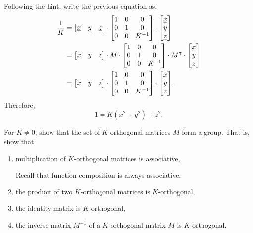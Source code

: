 \documentclass{ximera}
\begin{document}
\begin{problem}
\begin{freeResponse}
Following the hint, write the previous equation as,
\begin{align*}
\frac{1}{K} &=
\begin{bmatrix}
\underline{x} & \underline{y} & \underline{z}%
\end{bmatrix}  \cdot\begin{bmatrix}
1 & 0 & 0\\
0 & 1 & 0\\
0 & 0 & K^{-1}%
\end{bmatrix}  \cdot
\begin{bmatrix}
\underline{x}\\
\underline{y}\\
\underline{z}%
\end{bmatrix} \\
&= \begin{bmatrix}
    x & y & z
  \end{bmatrix} \cdot M \cdot
\begin{bmatrix}
1 & 0 & 0\\
0 & 1 & 0\\
0 & 0 & K^{-1}%
\end{bmatrix}  \cdot M^\transpose \cdot
\begin{bmatrix}
    x \\ y \\  z
  \end{bmatrix} \\
 &= \begin{bmatrix}
    x & y & z
  \end{bmatrix} \cdot 
\begin{bmatrix}
1 & 0 & 0\\
0 & 1 & 0\\
0 & 0 & K^{-1}%
\end{bmatrix}  \cdot 
\begin{bmatrix}
    x \\ y \\  z
  \end{bmatrix}.
\end{align*}
Therefore,
\[
1 = K\left(x^2 + y^2\right) +z^2.
\] 
\end{freeResponse}
\end{problem}




\begin{problem}
For $K\neq0$, show that the set of $K$-orthogonal matrices $M$ form a
group.  That is, show that
\begin{enumerate}
\item multiplication of $K$-orthogonal matrices is associative, 
	\begin{hint}
	Recall that function composition is always associative.
	\end{hint}
\item the product of two $K$-orthogonal matrices is $K$-orthogonal,
\item the identity matrix is $K$-orthogonal,
\item the inverse matrix $M^{-1}$ of a $K$-orthogonal matrix $M$ is $K$-orthogonal.
\end{enumerate}
\end{problem}
\end{document}
